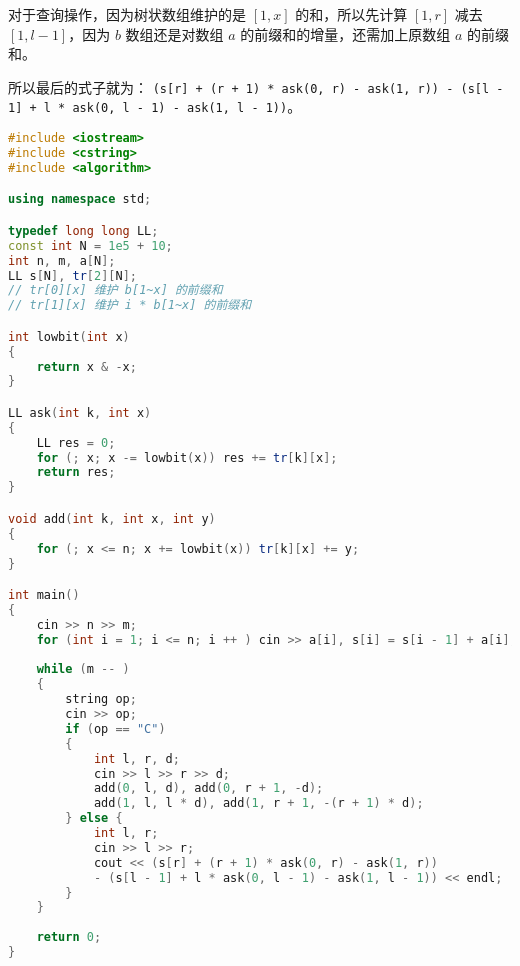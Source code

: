 对于查询操作，因为树状数组维护的是 $[1, x]$ 的和，所以先计算 $[1, r]$ 减去 $[1, l - 1]$，因为 $b$ 数组还是对数组 $a$ 的前缀和的增量，还需加上原数组 $a$ 的前缀和。

所以最后的式子就为：
\verb|(s[r] + (r + 1) * ask(0, r) - ask(1, r)) - (s[l - 1] + l * ask(0, l - 1) - ask(1, l - 1))|。

\begin{lstlisting}[language=cpp]
#include <iostream>
#include <cstring>
#include <algorithm>

using namespace std;

typedef long long LL;
const int N = 1e5 + 10;
int n, m, a[N];
LL s[N], tr[2][N];
// tr[0][x] 维护 b[1~x] 的前缀和
// tr[1][x] 维护 i * b[1~x] 的前缀和

int lowbit(int x)
{
    return x & -x;
}

LL ask(int k, int x)
{
    LL res = 0;
    for (; x; x -= lowbit(x)) res += tr[k][x];
    return res;
}

void add(int k, int x, int y)
{
    for (; x <= n; x += lowbit(x)) tr[k][x] += y;
}

int main()
{
    cin >> n >> m;
    for (int i = 1; i <= n; i ++ ) cin >> a[i], s[i] = s[i - 1] + a[i];
    
    while (m -- )
    {
        string op;
        cin >> op;
        if (op == "C")
        {
            int l, r, d;
            cin >> l >> r >> d;
            add(0, l, d), add(0, r + 1, -d);
            add(1, l, l * d), add(1, r + 1, -(r + 1) * d);
        } else {
            int l, r;
            cin >> l >> r;
            cout << (s[r] + (r + 1) * ask(0, r) - ask(1, r))
            - (s[l - 1] + l * ask(0, l - 1) - ask(1, l - 1)) << endl;
        }
    }
    
    return 0;
}
\end{lstlisting}